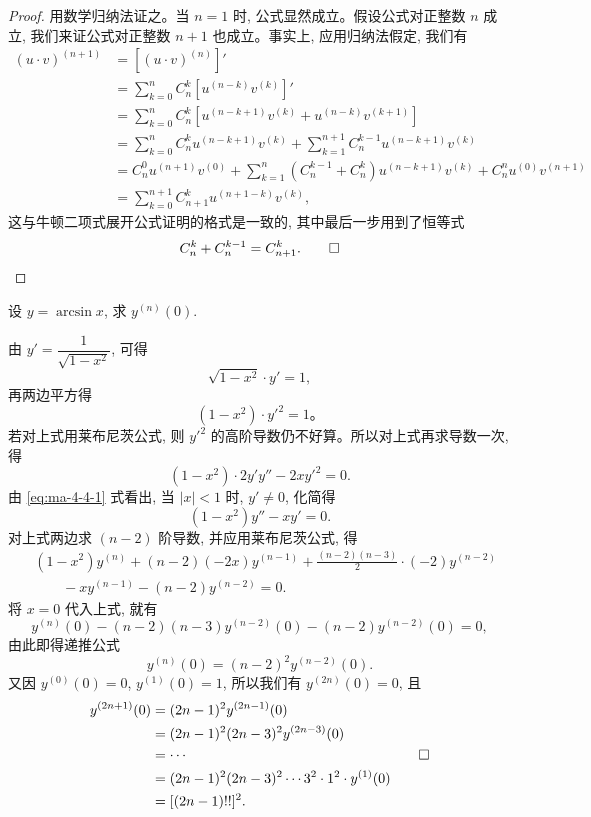 \begin{proof}
用数学归纳法证之。当 $n=1$ 时, 公式显然成立。假设公式对正整数 $n$ 成立, 我们来证公式对正整数 $n+1$ 也成立。事实上, 应用归纳法假定, 我们有
\[
\begin{aligned}
  (u\cdot v)^{(n+1)}
  &=
  \left[(u\cdot v)^{(n)}\right]'  \\
  &=
  \sum_{k=0}^{n}C_n^k\left[u^{(n-k)}v^{(k)}\right]'  \\
  &=
  \sum_{k=0}^{n}C_n^k
  \left[u^{(n-k+1)}v^{(k)}+u^{(n-k)}v^{(k+1)}\right]  \\
  &=
  \sum_{k=0}^{n}C_n^ku^{(n-k+1)}v^{(k)}
  +
  \sum_{k=1}^{n+1}C_n^{k-1}u^{(n-k+1)}v^{(k)}  \\
  &=
  C_n^0u^{(n+1)}v^{(0)}
  +
  \sum_{k=1}^{n}(C_n^{k-1}+C_n^k)u^{(n-k+1)}v^{(k)}
  +
  C_n^nu^{(0)}v^{(n+1)}  \\
  &=
  \sum_{k=0}^{n+1}C_{n+1}^ku^{(n+1-k)}v^{(k)},
\end{aligned}
\]
这与牛顿二项式展开公式证明的格式是一致的, 其中最后一步用到了恒等式
\[
  C_n^k+C_n^{k-1}=C_{n+1}^k.
\qedhere
\]
\end{proof}


\begin{example}\label{example:ma-4-4-6}
设 $y=\arcsin x$, 求 $y^{(n)}(0)$.
\end{example}


\begin{solve}
由 $y'=\dfrac{1}{\sqrt{1-x^2}}$, 可得
\[
  \sqrt{1-x^2}\cdot y'=1,
\]
再两边平方得
\begin{equation}
  (1-x^2)\cdot y'^2=1。\label{eq:ma-4-4-1}
\end{equation}
若对上式用莱布尼茨公式, 则 $y'^2$ 的高阶导数仍不好算。所以对上式再求导数一次, 得
\[
  (1-x^2)\cdot 2y'y''-2xy'^2=0.
\]
由 \eqref{eq:ma-4-4-1} 式看出, 当 $|x|<1$ 时, $y'\ne0$, 化简得
\[
  (1-x^2)y''-xy'=0.
\]
对上式两边求 $(n-2)$ 阶导数, 并应用莱布尼茨公式, 得
\[
\begin{aligned}
  &(1-x^2)y^{(n)}
  +(n-2)(-2x)y^{(n-1)}
  +\frac{(n-2)(n-3)}{2}\cdot(-2)y^{(n-2)}  \\
  &\qquad
  -xy^{(n-1)}-(n-2)y^{(n-2)}=0.
\end{aligned}
\]
将 $x=0$ 代入上式, 就有
\[
  y^{(n)}(0)
  -(n-2)(n-3)y^{(n-2)}(0)
  -(n-2)y^{(n-2)}(0)=0,
\]
由此即得递推公式
\[
  y^{(n)}(0)=(n-2)^2y^{(n-2)}(0).
\]
又因 $y^{(0)}(0)=0$, $y^{(1)}(0)=1$, 所以我们有 $y^{(2n)}(0)=0$, 且
\[
\begin{aligned}
  y^{(2n+1)}(0)
  &=
  (2n-1)^2y^{(2n-1)}(0)  \\
  &=
  (2n-1)^2(2n-3)^2y^{(2n-3)}(0)  \\
  &=\cdots  \\
  &=
  (2n-1)^2(2n-3)^2\cdots3^2\cdot1^2\cdot y^{(1)}(0)  \\
  &=
  [(2n-1)!!]^2.
\end{aligned}
\qedhere
\]
\end{solve}


